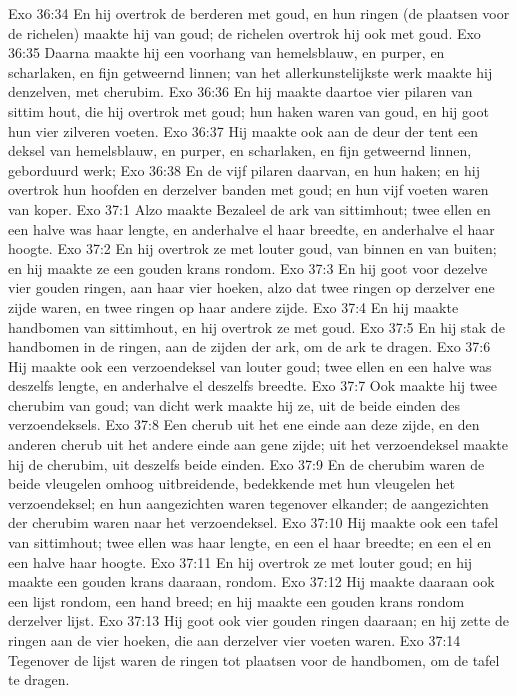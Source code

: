 Exo 36:34  En hij overtrok de berderen met goud, en hun ringen (de plaatsen voor de richelen) maakte hij van goud; de richelen overtrok hij ook met goud.
Exo 36:35  Daarna maakte hij een voorhang van hemelsblauw, en purper, en scharlaken, en fijn getweernd linnen; van het allerkunstelijkste werk maakte hij denzelven, met cherubim.
Exo 36:36  En hij maakte daartoe vier pilaren van sittim hout, die hij overtrok met goud; hun haken waren van goud, en hij goot hun vier zilveren voeten.
Exo 36:37  Hij maakte ook aan de deur der tent een deksel van hemelsblauw, en purper, en scharlaken, en fijn getweernd linnen, geborduurd werk;
Exo 36:38  En de vijf pilaren daarvan, en hun haken; en hij overtrok hun hoofden en derzelver banden met goud; en hun vijf voeten waren van koper.
Exo 37:1  Alzo maakte Bezaleel de ark van sittimhout; twee ellen en een halve was haar lengte, en anderhalve el haar breedte, en anderhalve el haar hoogte.
Exo 37:2  En hij overtrok ze met louter goud, van binnen en van buiten; en hij maakte ze een gouden krans rondom.
Exo 37:3  En hij goot voor dezelve vier gouden ringen, aan haar vier hoeken, alzo dat twee ringen op derzelver ene zijde waren, en twee ringen op haar andere zijde.
Exo 37:4  En hij maakte handbomen van sittimhout, en hij overtrok ze met goud.
Exo 37:5  En hij stak de handbomen in de ringen, aan de zijden der ark, om de ark te dragen.
Exo 37:6  Hij maakte ook een verzoendeksel van louter goud; twee ellen en een halve was deszelfs lengte, en anderhalve el deszelfs breedte.
Exo 37:7  Ook maakte hij twee cherubim van goud; van dicht werk maakte hij ze, uit de beide einden des verzoendeksels.
Exo 37:8  Een cherub uit het ene einde aan deze zijde, en den anderen cherub uit het andere einde aan gene zijde; uit het verzoendeksel maakte hij de cherubim, uit deszelfs beide einden.
Exo 37:9  En de cherubim waren de beide vleugelen omhoog uitbreidende, bedekkende met hun vleugelen het verzoendeksel; en hun aangezichten waren tegenover elkander; de aangezichten der cherubim waren naar het verzoendeksel.
Exo 37:10  Hij maakte ook een tafel van sittimhout; twee ellen was haar lengte, en een el haar breedte; en een el en een halve haar hoogte.
Exo 37:11  En hij overtrok ze met louter goud; en hij maakte een gouden krans daaraan, rondom.
Exo 37:12  Hij maakte daaraan ook een lijst rondom, een hand breed; en hij maakte een gouden krans rondom derzelver lijst.
Exo 37:13  Hij goot ook vier gouden ringen daaraan; en hij zette de ringen aan de vier hoeken, die aan derzelver vier voeten waren.
Exo 37:14  Tegenover de lijst waren de ringen tot plaatsen voor de handbomen, om de tafel te dragen.
